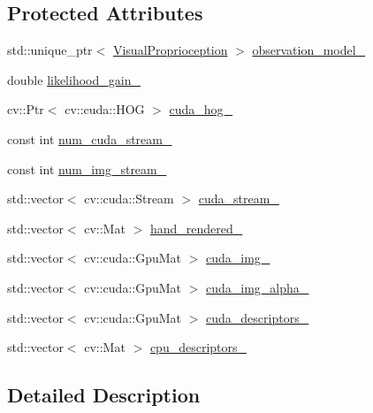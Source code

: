 \subsection*{Protected Attributes}
\begin{DoxyCompactItemize}
\item 
std\+::unique\+\_\+ptr$<$ \hyperlink{classVisualProprioception}{Visual\+Proprioception} $>$ \hyperlink{classVisualUpdateParticles_a7e076390fd3cb9e508d36d65235b179c}{observation\+\_\+model\+\_\+}
\item 
double \hyperlink{classVisualUpdateParticles_a3199afdf57b24df7193f3f50b87a252f}{likelihood\+\_\+gain\+\_\+}
\item 
cv\+::\+Ptr$<$ cv\+::cuda\+::\+H\+OG $>$ \hyperlink{classVisualUpdateParticles_add09a7f472a034679dfc77726d9cc4c3}{cuda\+\_\+hog\+\_\+}
\item 
const int \hyperlink{classVisualUpdateParticles_ace5e836ecda66975c5ec85ea92c305b8}{num\+\_\+cuda\+\_\+stream\+\_\+}
\item 
const int \hyperlink{classVisualUpdateParticles_aad9d0aba6b913489a8e63f7008ceeebe}{num\+\_\+img\+\_\+stream\+\_\+}
\item 
std\+::vector$<$ cv\+::cuda\+::\+Stream $>$ \hyperlink{classVisualUpdateParticles_af179d2c350a9f93a412200816b79a876}{cuda\+\_\+stream\+\_\+}
\item 
std\+::vector$<$ cv\+::\+Mat $>$ \hyperlink{classVisualUpdateParticles_a61bfe2a44d2cad15887f34484321bd93}{hand\+\_\+rendered\+\_\+}
\item 
std\+::vector$<$ cv\+::cuda\+::\+Gpu\+Mat $>$ \hyperlink{classVisualUpdateParticles_a885d5094c4a20b386607ee839792ce12}{cuda\+\_\+img\+\_\+}
\item 
std\+::vector$<$ cv\+::cuda\+::\+Gpu\+Mat $>$ \hyperlink{classVisualUpdateParticles_acb31efd3272b83b80e55018e577adbfc}{cuda\+\_\+img\+\_\+alpha\+\_\+}
\item 
std\+::vector$<$ cv\+::cuda\+::\+Gpu\+Mat $>$ \hyperlink{classVisualUpdateParticles_ae2de27efd67d8c5cfa661d97841aa9ea}{cuda\+\_\+descriptors\+\_\+}
\item 
std\+::vector$<$ cv\+::\+Mat $>$ \hyperlink{classVisualUpdateParticles_ac9c29a18fee44cd0bb5be0ff71e2f8d7}{cpu\+\_\+descriptors\+\_\+}
\end{DoxyCompactItemize}


\subsection{Detailed Description}


